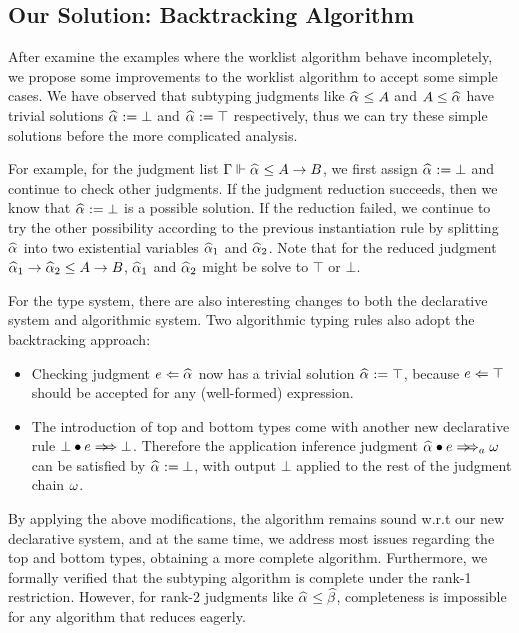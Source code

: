 

\subsection{Our Solution: Backtracking Algorithm}

After examine the examples where the worklist algorithm behave incompletely,
we propose some improvements to the worklist algorithm to accept some simple cases.
We have observed that subtyping judgments like $\al \le A$ and $A \le \al$ have trivial solutions
$\al := \bot$ and $\al := \top$ respectively,
thus we can try these simple solutions before the more complicated analysis.

For example, for the judgment list $\Gm \Vdash \al \le A \to B$,
we first assign $\al := \bot$ and continue to check other judgments.
If the judgment reduction succeeds, then we know that $\al := \bot$ is a possible solution.
If the reduction failed, we continue to try the other possibility according to the
previous instantiation rule by splitting $\al$ into two existential variables $\al[1]$ and $\al[2]$.
Note that for the reduced judgment $\al[1] \to \al[2] \le A \to B$,
$\al[1]$ and $\al[2]$ might be solve to $\top$ or $\bot$.

For the type system, there are also interesting changes to
both the declarative system and algorithmic system.
Two algorithmic typing rules also adopt the backtracking approach:
\begin{itemize}
    \item Checking judgment $e \Lto \al$ now has a trivial solution $\al := \top$,
        because $e \Leftarrow \top$ should be accepted for any (well-formed) expression.
    \item The introduction of top and bottom types come with another new declarative rule
        $\appInf{\bot}{e}{\bot}$.
        Therefore the application inference judgment $\appInfAlg{\al}{e}$
        can be satisfied by $\al := \bot$,
        with output $\bot$ applied to the rest of the judgment chain $\omega$.
\end{itemize}

By applying the above modifications,
the algorithm remains sound w.r.t our new declarative system,
and at the same time, we address most issues regarding the top and bottom types,
obtaining a more complete algorithm.
Furthermore, we formally verified that the subtyping algorithm
is complete under the rank-1 restriction.
However, for rank-2 judgments like $\al \le \bt$,
completeness is impossible for any algorithm that reduces eagerly.

